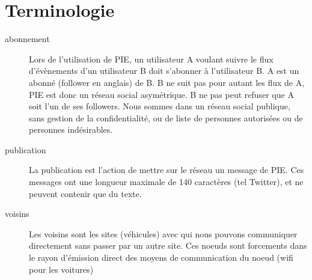 
\section{Terminologie}

\begin{description}

\item[abonnement]
Lors de l'utilisation de PIE, un utilisateur A voulant suivre le flux d'évènements d'un utilisateur B doit s'abonner à l'utilisateur B.
A est un abonné (follower en anglais) de B. B ne suit pas pour autant les flux de A, PIE est donc un réseau social asymétrique.
B ne pas peut refuser que A soit l'un de ses followers. Nous sommes dans un réseau social publique, sans gestion de la confidentialité, ou de liste de personnes autorisées ou de personnes indésirables.

\item[publication]
La publication est l'action de mettre sur le réseau un message de PIE. Ces messages ont une longueur maximale de 140 caractères (tel Twitter), et ne peuvent contenir que du texte.  

\item[voisins]
Les voisins sont les sites (véhicules) avec qui nous pouvons communiquer directement sans passer par un autre site. Ces noeuds sont forcements dans le rayon d'émission direct des moyens de communication du noeud (wifi pour les voitures)

\end{description}

